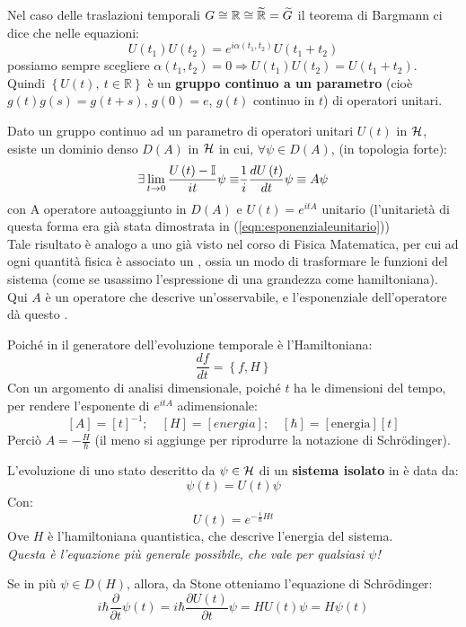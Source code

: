 \documentclass[../../FisicaTeorica.tex]{subfiles}
\begin{document}
Nel caso delle traslazioni temporali $G\cong \mathbb{R}\cong \widetilde{\mathbb{R}}=\widetilde{G}$ il teorema di Bargmann ci dice che nelle equazioni:
\[
U\left(t_1\right)U\left(t_2\right)=e^{i\alpha\left(t_1,t_2\right)}U\left(t_1+t_2\right)
\]
possiamo sempre scegliere $\alpha \left(t_1,t_2\right)=0\Rightarrow U\left(t_1\right)U\left(t_2\right)=U\left(t_1+t_2\right)$.\\
Quindi $\left\{U\left(t\right),\ t\in\mathbb{R}\right\}$ è un \textbf{gruppo continuo a un parametro} (cioè $g\left(t\right)g\left(s\right)=g(t+s)$, $g\left(0\right)=e$, $g(t)$ continuo in $t$) di operatori unitari.

\begin{thm}
Dato un gruppo continuo ad un parametro di operatori unitari $U(t)$ in $\mathcal{H}$, esiste un dominio denso $D\left(A\right)$ in $\mathcal{H}$ in cui, $\forall \psi \in D\left(A\right)$, (in topologia forte):
\[
\exists \lim_{t\rightarrow0}{\frac{U\left(t\right)-\mathbb{I}}{it}\psi\equiv}\frac{1}{i}\frac{dU\left(t\right)}{dt}\psi \equiv A\psi
\]
con A operatore autoaggiunto in $D\left(A\right)$ e $U\left(t\right)=e^{itA}$ unitario (l'unitarietà di questa forma era già stata dimostrata in (\ref{eqn:esponenzialeunitario}))\\
Tale risultato è analogo a uno già visto nel corso di Fisica Matematica, per cui ad ogni quantità fisica è associato un , ossia un modo di trasformare le funzioni del sistema (come se usassimo l'espressione di una grandezza come hamiltoniana). Qui $A$ è un operatore che descrive un'osservabile, e l'esponenziale dell'operatore dà questo .
\end{thm}
Poiché in \MC il generatore dell'evoluzione temporale è l'Hamiltoniana:
\[
\frac{df}{dt}=\left\{f,H\right\}
\]
Con un argomento di analisi dimensionale, poiché $t$ ha le dimensioni del tempo, per rendere l'esponente di $e^{itA}$ adimensionale:
\[
\left[A\right]=\left[t\right]^{-1}; \quad
\left[H\right]=\left[energia\right]; \quad
\left[\hbar\right]=\left[\text{energia}\right]\left[t\right]
\]
Perciò $A=-\frac{H}{\hbar}$ (il meno si aggiunge per riprodurre la notazione di Schrödinger).

\begin{axi}
L'evoluzione di uno stato descritto da $\psi \in \mathcal{H}$ di un \textbf{sistema isolato} in \MQ è data da:
\[
\psi \left(t\right)=U\left(t\right)\psi 
\]
Con:
\[
U\left(t\right)=e^{-\frac{i}{\hbar}Ht}
\]
Ove $H$ è l'hamiltoniana quantistica, che descrive l'energia del sistema.\\
\textit{Questa è l'equazione più generale possibile, che vale per qualsiasi $\psi$!}
\end{axi}
Se in più $\psi \in D(H)$, allora, da Stone otteniamo l'equazione di Schrödinger:
\[
i\hbar \frac{\partial}{\partial t}\psi(t) = i\hbar \frac{\partial U(t)}{\partial t}\psi = HU(t)\psi = H\psi(t) 
\]
\end{document}
